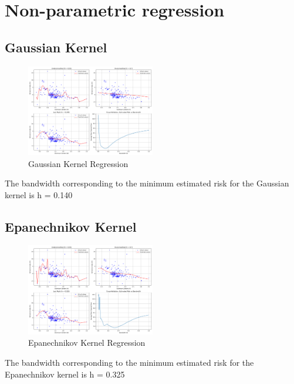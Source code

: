 \section{Non-parametric regression}
\subsection{Gaussian Kernel}
\vspace{-10pt}
\begin{figure}[H]
    \centering
    \includegraphics[width=0.5\textwidth]{./images/4/gaussian_kernel_regression.png}
    \caption{Gaussian Kernel Regression}
\end{figure}
The bandwidth corresponding to the minimum estimated risk for the Gaussian kernel is h = 0.140

\subsection{Epanechnikov Kernel}
\vspace{-10pt}
\begin{figure}[H]
    \centering
    \includegraphics[width=0.5\textwidth]{./images/4/epanechnikov_kernel_regression.png}
    \caption{Epanechnikov Kernel Regression}
\end{figure}
The bandwidth corresponding to the minimum estimated risk for the Epanechnikov kernel is h = 0.325

